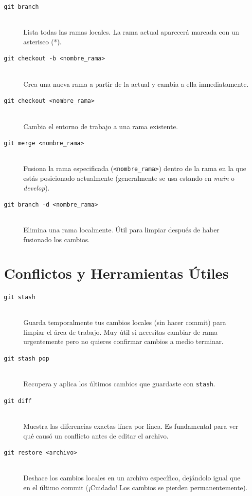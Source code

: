\documentclass[11pt]{article}
\begin{document}
\begin{description}
    \item[\texttt{git branch}] \hfill \\
    Lista todas las ramas locales. La rama actual aparecerá marcada con un asterisco (*).

    \item[\texttt{git checkout -b <nombre\_rama>}] \hfill \\
    Crea una nueva rama a partir de la actual y cambia a ella inmediatamente.

    \item[\texttt{git checkout <nombre\_rama>}] \hfill \\
    Cambia el entorno de trabajo a una rama existente.

    \item[\texttt{git merge <nombre\_rama>}] \hfill \\
    Fusiona la rama especificada (\texttt{<nombre\_rama>}) dentro de la rama en la que estás posicionado actualmente (generalmente se usa estando en \textit{main} o \textit{develop}).

    \item[\texttt{git branch -d <nombre\_rama>}] \hfill \\
    Elimina una rama localmente. Útil para limpiar después de haber fusionado los cambios.
\end{description}

\section*{Conflictos y Herramientas Útiles}

\begin{description}
    \item[\texttt{git stash}] \hfill \\
    Guarda temporalmente tus cambios locales (sin hacer commit) para limpiar el área de trabajo. Muy útil si necesitas cambiar de rama urgentemente pero no quieres confirmar cambios a medio terminar.

    \item[\texttt{git stash pop}] \hfill \\
    Recupera y aplica los últimos cambios que guardaste con \texttt{stash}.

    \item[\texttt{git diff}] \hfill \\
    Muestra las diferencias exactas línea por línea. Es fundamental para ver qué causó un conflicto antes de editar el archivo.

    \item[\texttt{git restore <archivo>}] \hfill \\
    Deshace los cambios locales en un archivo específico, dejándolo igual que en el último commit (¡Cuidado! Los cambios se pierden permanentemente).
\end{description}
\end{document}
